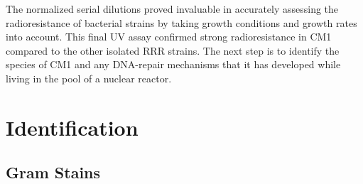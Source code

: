 \documentclass[12pt,twoside]{reedthesis}
\begin{document}
The normalized serial dilutions proved invaluable in accurately assessing the radioresistance of bacterial strains by taking growth conditions and growth rates into account. This final UV assay confirmed strong radioresistance in CM1 compared to the other isolated RRR strains. The next step is to identify the species of CM1 and any DNA-repair mechanisms that it has developed while living in the pool of a nuclear reactor.

\hypertarget{identification}{%
\section{Identification}\label{identification}}

\hypertarget{gram-stains}{%
\subsection{Gram Stains}\label{gram-stains}}
\end{document}
